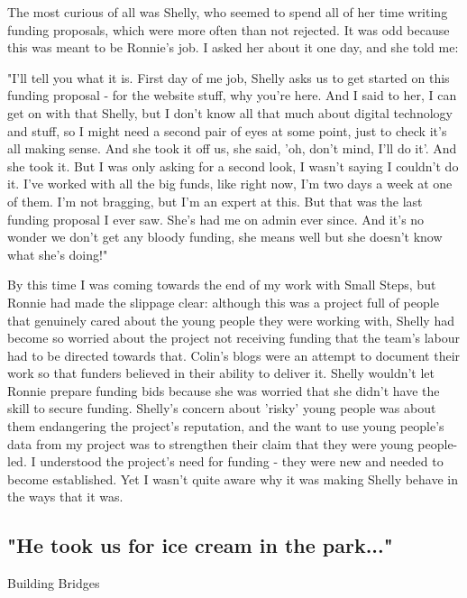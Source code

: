 The most curious of all was Shelly, who seemed to spend all of her time writing funding proposals, which were more often than not rejected. It was odd because this was meant to be Ronnie's job. I asked her about it one day, and she told me:

"I'll tell you what it is. First day of me job, Shelly asks us to get started on this funding proposal - for the website stuff, why you're here. And I said to her, I can get on with that Shelly, but I don't know all that much about digital technology and stuff, so I might need a second pair of eyes at some point, just to check it's all making sense. And she took it off us, she said, 'oh, don't mind, I'll do it'. And she took it. But I was only asking for a second look, I wasn't saying I couldn't do it. I've worked with all the big funds, like right now, I'm two days a week at one of them. I'm not bragging, but I'm an expert at this. But that was the last funding proposal I ever saw. She's had me on admin ever since. And it's no wonder we don't get any bloody funding, she means well but she doesn't know what she's doing!"

By this time I was coming towards the end of my work with Small Steps, but Ronnie had made the slippage clear: although this was a project full of people that genuinely cared about the young people they were working with, Shelly had become so worried about the project not receiving funding that the team's labour had to be directed towards that. Colin's blogs were an attempt to document their work so that funders believed in their ability to deliver it. Shelly wouldn't let Ronnie prepare funding bids because she was worried that she didn't have the skill to secure funding. Shelly's concern about 'risky' young people was about them endangering the project's reputation, and the want to use young people's data from my project was to strengthen their claim that they were young people-led. I understood the project's need for funding - they were new and needed to become established. Yet I wasn't quite aware why it was making Shelly behave in the ways that it was. 

\subsection{"He took us for ice cream in the park..."}
Building Bridges

